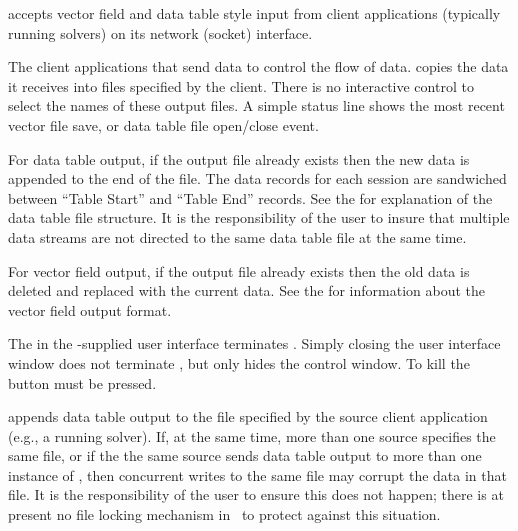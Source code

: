 accepts vector field and data table style input from
client applications (typically running solvers) on its network (socket)
interface.

The client applications that send data to  control the
flow of data.   copies the data it receives into files
specified by the client.  There is no interactive control to select the
names of these output files.  A simple status line shows the most recent
vector file save, or data table file open/close event.

For data table output, if the output file already exists then the new
data is appended to the end of the file.  The data records for each
session are sandwiched between ``Table Start'' and ``Table End''
records.  See the  for
explanation of the data table file structure.  It is the
responsibility of the user to insure that multiple data streams are
not directed to the same data table file at the same time.

For vector field output, if the output file already exists then the
old data is deleted and replaced with the current data.  See the
 for information
about the vector field output format.

The  in the -supplied user interface terminates
.  Simply closing the user interface window does not
terminate , but only hides the control window.  To kill
 the  button must be pressed.

 appends data table output to the file specified by the
source client application (e.g., a running solver).  If, at the same
time, more than one source specifies the same file, or if the the same
source sends data table output to more than one instance of
, then concurrent writes to the same file may corrupt the
data in that file.  It is the responsibility of the user to ensure this
does not happen; there is at present no file locking mechanism in
\OOMMF\ to protect against this situation.
